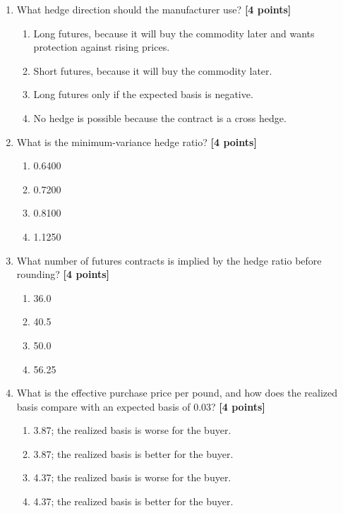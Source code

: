 \documentclass[11pt]{article}
\newcommand{\pts}[1]{\hspace{0.35em}\textnormal{\textbf{[#1 points]}}}
\newenvironment{choices}{\begin{enumerate}[label=\Alph*.,leftmargin=2.2em,itemsep=0.12em,topsep=0.12em]}{\end{enumerate}}
\begin{document}
\begin{enumerate}
    \item What hedge direction should the manufacturer use? \pts{4}
    \begin{choices}
        \item Long futures, because it will buy the commodity later and wants
        protection against rising prices.
        \item Short futures, because it will buy the commodity later.
        \item Long futures only if the expected basis is negative.
        \item No hedge is possible because the contract is a cross hedge.
    \end{choices}

    \item What is the minimum-variance hedge ratio? \pts{4}
    \begin{choices}
        \item 0.6400
        \item 0.7200
        \item 0.8100
        \item 1.1250
    \end{choices}

    \item What number of futures contracts is implied by the hedge ratio before
    rounding? \pts{4}
    \begin{choices}
        \item 36.0
        \item 40.5
        \item 50.0
        \item 56.25
    \end{choices}

    \item What is the effective purchase price per pound, and how does the
    realized basis compare with an expected basis of 0.03? \pts{4}
    \begin{choices}
        \item 3.87; the realized basis is worse for the buyer.
        \item 3.87; the realized basis is better for the buyer.
        \item 4.37; the realized basis is worse for the buyer.
        \item 4.37; the realized basis is better for the buyer.
    \end{choices}
\end{enumerate}
\end{document}
